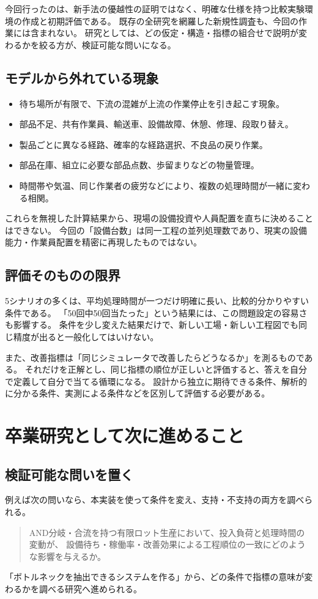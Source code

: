 \documentclass[a4paper,11pt]{ltjsarticle}
\begin{document}
今回行ったのは、新手法の優越性の証明ではなく、明確な仕様を持つ比較実験環境の作成と初期評価である。
既存の全研究を網羅した新規性調査も、今回の作業には含まれない。
研究としては、どの仮定・構造・指標の組合せで説明が変わるかを絞る方が、検証可能な問いになる。

\subsection{モデルから外れている現象}
\begin{itemize}
\item 待ち場所が有限で、下流の混雑が上流の作業停止を引き起こす現象。
\item 部品不足、共有作業員、輸送車、設備故障、休憩、修理、段取り替え。
\item 製品ごとに異なる経路、確率的な経路選択、不良品の戻り作業。
\item 部品在庫、組立に必要な部品点数、歩留まりなどの物量管理。
\item 時間帯や気温、同じ作業者の疲労などにより、複数の処理時間が一緒に変わる相関。
\end{itemize}
これらを無視した計算結果から、現場の設備投資や人員配置を直ちに決めることはできない。
今回の「設備台数」は同一工程の並列処理数であり、現実の設備能力・作業員配置を精密に再現したものではない。

\subsection{評価そのものの限界}
5シナリオの多くは、平均処理時間が一つだけ明確に長い、比較的分かりやすい条件である。
「50回中50回当たった」という結果には、この問題設定の容易さも影響する。
条件を少し変えた結果だけで、新しい工場・新しい工程図でも同じ精度が出ると一般化してはいけない。

また、改善指標は「同じシミュレータで改善したらどうなるか」を測るものである。
それだけを正解とし、同じ指標の順位が正しいと評価すると、答えを自分で定義して自分で当てる循環になる。
設計から独立に期待できる条件、解析的に分かる条件、実測による条件などを区別して評価する必要がある。

\clearpage
\section{卒業研究として次に進めること}
\subsection{検証可能な問いを置く}
例えば次の問いなら、本実装を使って条件を変え、支持・不支持の両方を調べられる。
\begin{quote}
AND分岐・合流を持つ有限ロット生産において、投入負荷と処理時間の変動が、
設備待ち・稼働率・改善効果による工程順位の一致にどのような影響を与えるか。
\end{quote}
「ボトルネックを抽出できるシステムを作る」から、どの条件で指標の意味が変わるかを調べる研究へ進められる。
\end{document}
